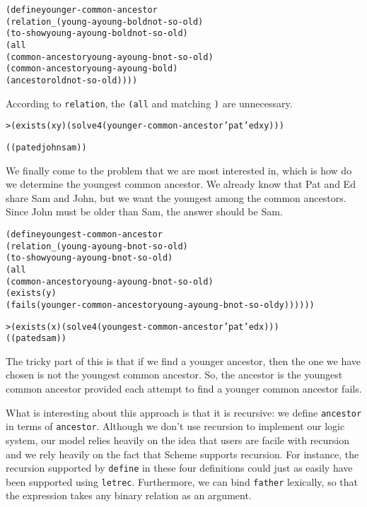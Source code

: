 \begin{alltt}
(define younger-common-ancestor
  (relation _ (young-a young-b old not-so-old)
    (to-show young-a young-b old not-so-old)
    (all
      (common-ancestor young-a young-b not-so-old)
      (common-ancestor young-a young-b old)
      (ancestor old not-so-old))))
\end{alltt}

According to \texttt{relation}, the \texttt{(all} and matching
\texttt{)} are unnecessary.

\begin{alltt}
> (exists (x y) (solve 4 (younger-common-ancestor 'pat 'ed x y)))

((pat ed john sam))
\end{alltt}

We finally come to the problem that we are most interested in, which
is how do we determine the youngest common ancestor.  We already know
that Pat and Ed share Sam and John, but we want the youngest among the
common ancestors. Since John must be older than Sam, the answer should
be Sam.

\begin{alltt}
(define youngest-common-ancestor
  (relation _ (young-a young-b not-so-old)
    (to-show young-a young-b not-so-old)
    (all
      (common-ancestor young-a young-b not-so-old)
      (exists (y)
        (fails (younger-common-ancestor young-a young-b not-so-old y))))))

> (exists (x) (solve 4 (youngest-common-ancestor 'pat 'ed x)))
((pat ed sam))
\end{alltt}

\noindent
The tricky part of this is that if we find a younger ancestor,
then the one we have chosen is not the youngest common ancestor.  So, the
ancestor is the youngest common ancestor provided each attempt to find
a younger common ancestor fails.

What is interesting about this approach is that it is recursive: we
define \texttt{ancestor} in terms of \texttt{ancestor}.  Although
we don't use recursion to implement our logic system, our model
relies heavily on the idea that users are facile with recursion
and we rely heavily on the fact that Scheme supports recursion.  For
instance, the recursion supported by \texttt{define} in these four
definitions could just as easily have been supported using
\texttt{letrec}.  Furthermore, we can bind \texttt{father} lexically,
so that the expression takes any binary relation as an argument.

